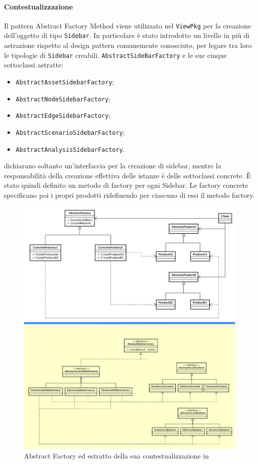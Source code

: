 \paragraph{Contestualizzazione}
Il pattern Abstract Factory Method viene utilizzato nel  \texttt{ViewPkg} per la creazione dell'oggetto di tipo \texttt{Sidebar}.
In particolare è stato introdotto un livello in più di astrazione rispetto al design pattern comunemente conosciuto, per legare tra loro le tipologie di \texttt{Sidebar} creabili.
\texttt{AbstractSideBarFactory} e le sue cinque sottoclassi astratte:
\begin{itemize}
	\item \texttt{AbstractAssetSidebarFactory};
	 \item \texttt{AbstractNodeSidebarFactory};
	 \item \texttt{AbstractEdgeSidebarFactory};
	 \item \texttt{AbstractScenarioSidebarFactory};
	 \item \texttt{AbstractAnalysisSidebarFactory}.
\end{itemize}
dichiarano soltanto un'interfaccia per la creazione di sidebar, mentre la responsabilità della creazione effettiva delle istanze è delle sottoclassi concrete. È stato quindi definito un metodo di factory per ogni Sidebar. Le factory concrete specificano poi i propri prodotti ridefinendo per ciascuno di essi il metodo factory.
	\begin{figure}[H]
		\label{builder_compara}
		\centering
		\includegraphics[width=\textwidth]{img/absComparati.png}
		\caption{Abstract Factory ed estratto della sua contestualizzazione in \progetto}
	\end{figure}

